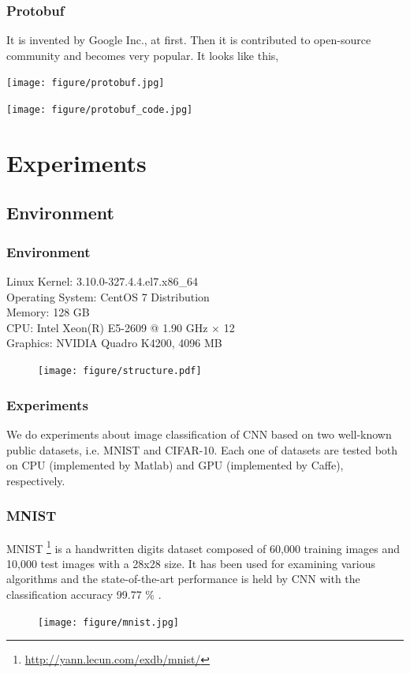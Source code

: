 \documentclass[10pt, mathserif]{beamer}	%
\newcommand{\ftitle}[1]{\frametitle{\hspace{4ex} {#1}}}	%
\begin{document}
\begin{CJK}{UTF8}{song}
\begin{frame}
	\ftitle{Protobuf}
	It is invented by Google Inc., at first. Then it is contributed to open-source community and becomes very popular. It looks like this,\\
	\begin{minipage}{0.45\textwidth}
		\centering
		\texttt{[image: figure/protobuf.jpg]}
	\end{minipage}
	\begin{minipage}{0.5\textwidth}
		\centering
		\texttt{[image: figure/protobuf\_code.jpg]}
	\end{minipage}	
\end{frame}

\section{Experiments}
\subsection{Environment}
\begin{frame}
	\ftitle{Environment}
	Linux Kernel: 3.10.0-327.4.4.el7.x86\_64 \\
	Operating System: CentOS 7 Distribution \\
	Memory: 128 GB \\
	CPU: Intel Xeon(R) E5-2609 @ 1.90 GHz $\times$ 12 \\
	Graphics: NVIDIA Quadro K4200, 4096 MB
	\begin{figure}[htbp]
		\centering
		\texttt{[image: figure/structure.pdf]}
	\end{figure}
\end{frame}

\begin{frame}
	\ftitle{Experiments}
	We do experiments about image classification of CNN based on two well-known public datasets, i.e. MNIST and CIFAR-10. Each one of datasets are tested both on CPU (implemented by Matlab) and GPU (implemented by Caffe), respectively.
\end{frame}

\begin{frame}
	\ftitle{MNIST}
	MNIST \footnote{\url{http://yann.lecun.com/exdb/mnist/}} is a handwritten digits dataset composed of 60,000 training images and 10,000 test images with a 28x28 size. It has been used for examining various algorithms and the state-of-the-art performance is held by CNN with the classification accuracy 99.77 \% \cite{ciresan2012multi}.
	\begin{figure}[htbp]
		\centering
		\texttt{[image: figure/mnist.jpg]}
	\end{figure}
\end{frame}


\end{CJK}
\end{document}
